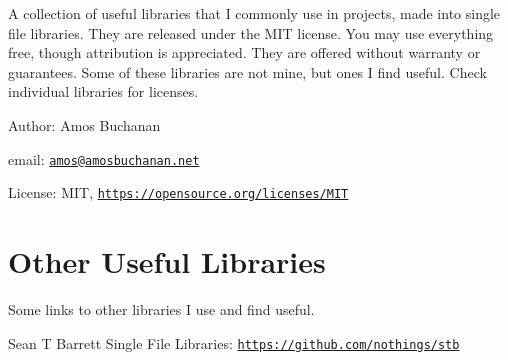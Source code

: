 A collection of useful libraries that I commonly use in projects, made into single file libraries. They are released under the M\+IT license. You may use everything free, though attribution is appreciated. They are offered without warranty or guarantees. Some of these libraries are not mine, but ones I find useful. Check individual libraries for licenses.


\begin{DoxyItemize}
\item Author\+: Amos Buchanan
\item email\+: \href{mailto:amos@amosbuchanan.net}{\tt amos@amosbuchanan.\+net}
\item License\+: M\+IT, \href{https://opensource.org/licenses/MIT}{\tt https\+://opensource.\+org/licenses/\+M\+IT}
\end{DoxyItemize}

\section*{Other Useful Libraries}

Some links to other libraries I use and find useful.


\begin{DoxyItemize}
\item Sean T Barrett Single File Libraries\+: \href{https://github.com/nothings/stb}{\tt https\+://github.\+com/nothings/stb} 
\end{DoxyItemize}
